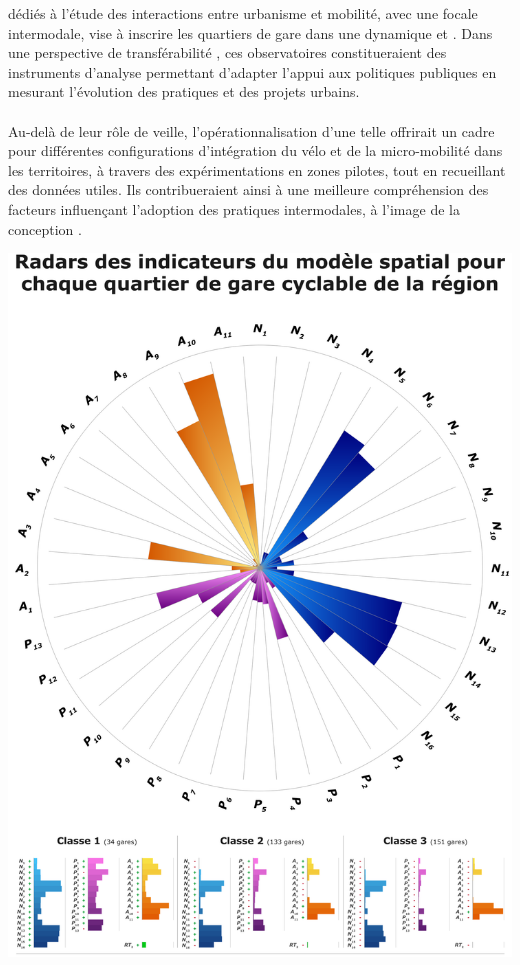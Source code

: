 \documentclass[../main.tex]{subfiles}
\begin{document}
    \begin{multicols}{2}
    \raggedcolumns
    \small{
 dédiés à l’étude des interactions entre urbanisme et mobilité, avec une focale intermodale, vise à inscrire les quartiers de gare dans une dynamique  et . Dans une perspective de transférabilité , ces observatoires constitueraient des instruments d’analyse permettant d'adapter l'appui aux politiques publiques en mesurant l’évolution des pratiques et des projets urbains.
    \\\\
Au-delà de leur rôle de veille, l'opérationnalisation d'une telle  offrirait un cadre pour  différentes configurations d’intégration du vélo et de la micro-mobilité dans les territoires, à travers des expérimentations en zones pilotes, tout en recueillant des données utiles. Ils contribueraient ainsi à une meilleure compréhension des facteurs influençant l’adoption des pratiques intermodales, à l'image de la conception .
    }
\begin{center}
    \includegraphics[width=\columnwidth]{figures/policy-brief-radar.png}

\end{center}
\end{multicols}
\end{document}
